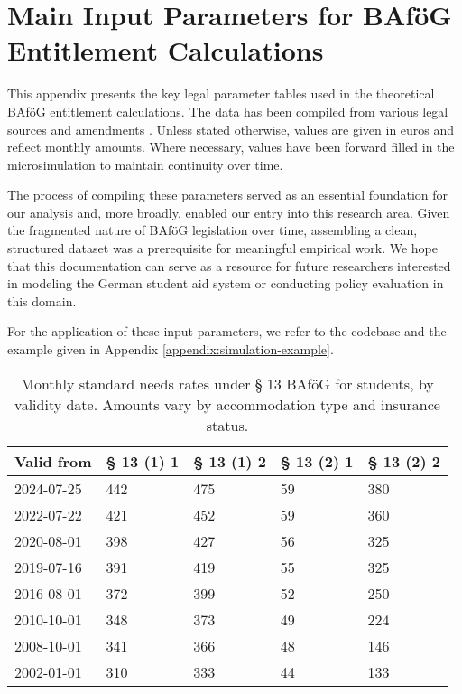 \newpage
\section{Main Input Parameters for BAföG Entitlement Calculations} \label{appendix:input_params}

This appendix presents the key legal parameter tables used in the theoretical BAföG entitlement calculations. 
The data has been compiled from various legal sources and amendments \cite{bafoeg_law, bafoeg20, bafoeg21, bafoeg22, bafoeg23, bafoeg24, bafoeg25, bafoeg26, bafoeg27, bafoeg28}. 
Unless stated otherwise, values are given in euros and reflect monthly amounts. Where necessary, values have been forward filled in the microsimulation to maintain continuity over time.

The process of compiling these parameters served as an essential foundation for our analysis and, more broadly, enabled our entry into this research area. 
Given the fragmented nature of BAföG legislation over time, assembling a clean, structured dataset was a prerequisite for meaningful empirical work. 
We hope that this documentation can serve as a resource for future researchers interested in modeling the German student aid system or conducting policy evaluation in this domain.

For the application of these input parameters, we refer to the codebase \citep[][version~\texttt{v1.0}]{bystrom2025msc} and the example given in Appendix \ref{appendix:simulation-example}.
\vspace{1em}

\begin{table}[H]
\centering
\small
\begin{tabularx}{\textwidth}{lXXXX}
\toprule
\textbf{Valid from} & \textbf{§ 13 (1) 1} & \textbf{§ 13 (1) 2} & \textbf{§ 13 (2) 1} & \textbf{§ 13 (2) 2} \\
\midrule
2024-07-25 & 442 & 475 & 59 & 380 \\
2022-07-22 & 421 & 452 & 59 & 360 \\
2020-08-01 & 398 & 427 & 56 & 325 \\
2019-07-16 & 391 & 419 & 55 & 325 \\
2016-08-01 & 372 & 399 & 52 & 250 \\
2010-10-01 & 348 & 373 & 49 & 224 \\
2008-10-01 & 341 & 366 & 48 & 146 \\
2002-01-01 & 310 & 333 & 44 & 133 \\
\bottomrule
\end{tabularx}
\caption{Monthly standard needs rates under § 13 BAföG for students, by validity date. Amounts vary by accommodation type and insurance status.}
\label{tab:bafog_values_13}
\end{table}

